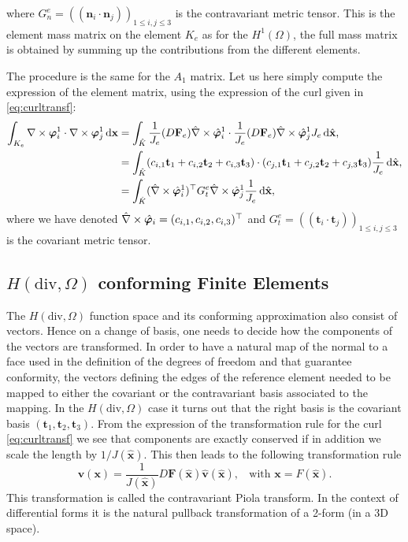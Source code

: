  where $G^e_n= (( \mathbf{n}_i\cdot \mathbf{n}_j))_{1\leq i,j\leq 3}$ is the contravariant metric tensor. This is the element mass matrix on the element $K_e$ as for the $ H^1(\Omega)$, the full mass matrix is obtained by summing up the contributions from the different elements.
 
 The procedure is the same for the $A_1$ matrix. Let us here simply compute the expression of the element matrix, using the expression of the curl given in \eqref{eq:curltransf}:
 \begin{align*}
   \int_{K_e} \nabla\times\boldsymbol{\varphi}^1_i\cdot \nabla\times\boldsymbol{\varphi}^1_j \,{\rm d} \mathbf{x} &=
 \int_{\hat{K}} \frac{1}{J_e}(D \mathbf{F}_e)\hat{\nabla}\times\hat{\boldsymbol{\varphi}}^1_i\cdot \frac{1}{J_e}(D \mathbf{F}_e)\hat{\nabla}\times \hat{\boldsymbol{\varphi}}^1_j J_e\,{\rm d} \hat{\mathbf{x}}, \\
 &= \int_{\hat{K}} (c_{i,1} \mathbf{t}_1 +c_{i,2} \mathbf{t}_2 +c_{i,3} \mathbf{t}_3 )
 \cdot (c_{j,1} \mathbf{t}_1 +c_{j,2} \mathbf{t}_2 +c_{j,3} \mathbf{t}_3 )
\frac{1}{J_e}\,{\rm d} \hat{\mathbf{x}},\\
 &=  \int_{\hat{K}} (\hat{\nabla}\times\hat{\boldsymbol{\varphi}}^1_i)^\top G^e_t \hat{\nabla}\times\hat{\boldsymbol{\varphi}}^1_j \frac{1}{J_e}\,{\rm d} \hat{\mathbf{x}},
 \end{align*}
 where we have denoted $\hat{\nabla}\times\hat{\boldsymbol{\varphi}}_i=(c_{i,1},c_{i,2},c_{i,3})^\top$ and
 $G^e_t= (( \mathbf{t}_i\cdot \mathbf{t}_j))_{1\leq i,j\leq 3}$ is the covariant metric tensor.


\subsection{$H(\textrm{div}, \Omega)$ conforming Finite Elements}

The $H(\textrm{div}, \Omega)$ function space and its conforming approximation also consist of vectors. Hence on a change of basis, one needs to decide how the components of the vectors are transformed. In order to have a natural map of the  normal to a face used in the definition of the degrees of freedom and that guarantee conformity, the vectors defining the edges of the reference element needed to be mapped to either the covariant or the contravariant basis associated to the mapping. In the  $H(\textrm{div}, \Omega)$ case it turns out that the right basis is the covariant basis $( \mathbf{t}_1, \mathbf{t}_2, \mathbf{t}_3)$. From the expression of the transformation rule for the curl \eqref{eq:curltransf} we see that components are exactly conserved if in addition we scale the length by $1/J( \hat{\mathbf{x}})$.
This then leads to the following transformation rule 
\begin{equation}\label{eq:piolahdiv}
\mathbf{v}( \mathbf{x}) = \frac{1}{J (\hat{\mathbf{x}})} D \mathbf{F}(\hat{\mathbf{x}}) \hat{\mathbf{v}} (\hat{\mathbf{x}}), ~~~~\mbox{with } \mathbf{x} = F(\hat{\mathbf{x}}).
\end{equation}
This transformation is called the contravariant Piola transform. In the context of differential forms it is the natural pullback transformation of a 2-form (in a 3D space). 

